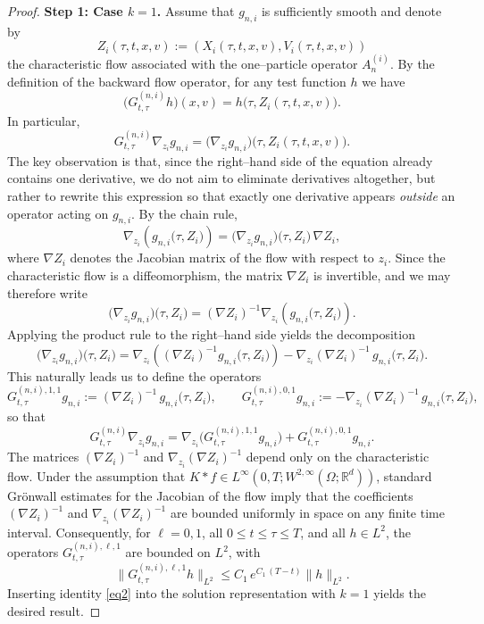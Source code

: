 \documentclass[pdflatex,sn-mathphys-num]{sn-jnl}
\theoremstyle{thmstyleone}%
\theoremstyle{thmstyletwo}%
\theoremstyle{thmstylethree}%
\begin{document}
\begin{proof}
\medskip
\noindent\textbf{Step 1: Case $k=1$.}
Assume that $g_{n,i}$ is sufficiently smooth and denote by
\[
Z_i(\tau,t,x,v) := (X_i(\tau,t,x,v), V_i(\tau,t,x,v))
\]
the characteristic flow associated with the one--particle operator $A_n^{(i)}$.
By the definition of the backward flow operator, for any test function $h$ we have
\[
\big(G^{(n,i)}_{t,\tau} h\big)(x,v) = h\big(\tau, Z_i(\tau,t,x,v)\big).
\]
In particular,
\[
G^{(n,i)}_{t,\tau}\nabla_{z_i} g_{n,i}
=
\big(\nabla_{z_i} g_{n,i}\big)\big(\tau,Z_i(\tau,t,x,v)\big).
\]
The key observation is that, since the right--hand side of the equation already
contains one derivative, we do not aim to eliminate derivatives altogether, but
rather to rewrite this expression so that exactly one derivative appears
\emph{outside} an operator acting on $g_{n,i}$. By the chain rule,
\[
\nabla_{z_i}\!\left(g_{n,i}\big(\tau,Z_i\big)\right)
=
\big(\nabla_{z_i} g_{n,i}\big)\big(\tau,Z_i\big)\,\nabla Z_i,
\]
where $\nabla Z_i$ denotes the Jacobian matrix of the flow with respect to $z_i$.
Since the characteristic flow is a diffeomorphism, the matrix $\nabla Z_i$ is
invertible, and we may therefore write
\[
\big(\nabla_{z_i} g_{n,i}\big)\big(\tau,Z_i\big)
=
(\nabla Z_i)^{-1}
\nabla_{z_i}\!\left(g_{n,i}\big(\tau,Z_i\big)\right).
\]
Applying the product rule to the right--hand side yields the decomposition
\[
\big(\nabla_{z_i} g_{n,i}\big)\big(\tau,Z_i\big)
=
\nabla_{z_i}\!\left((\nabla Z_i)^{-1} g_{n,i}\big(\tau,Z_i\big)\right)
-
\nabla_{z_i}(\nabla Z_i)^{-1}\,
g_{n,i}\big(\tau,Z_i\big).
\]
This naturally leads us to define the operators
\[
G^{(n,i),1,1}_{t,\tau} g_{n,i}
:=
(\nabla Z_i)^{-1}\, g_{n,i}\big(\tau,Z_i\big),
\qquad
G^{(n,i),0,1}_{t,\tau} g_{n,i}
:=
-\nabla_{z_i}(\nabla Z_i)^{-1}\, g_{n,i}\big(\tau,Z_i\big),
\]
so that
\begin{equation}\label{eq2}
G^{(n,i)}_{t,\tau}\nabla_{z_i} g_{n,i}
=
\nabla_{z_i}\big(G^{(n,i),1,1}_{t,\tau} g_{n,i}\big)
+
G^{(n,i),0,1}_{t,\tau} g_{n,i}.
\end{equation}
The matrices $(\nabla Z_i)^{-1}$ and $\nabla_{z_i}(\nabla Z_i)^{-1}$ depend only on
the characteristic flow. Under the assumption that $K*f \in L^{\infty}(0,T;W^{2,\infty}(\Omega;\mathbb{R}^d))$, standard Gr\"onwall estimates for the
Jacobian of the flow imply that the coefficients $(\nabla Z_i)^{-1}$ and
$\nabla_{z_i}(\nabla Z_i)^{-1}$ are bounded uniformly in space on any finite time
interval. Consequently, for $\ell=0,1$, all $0\le t\le \tau\le T$, and all $h \in L^2$, the operators
$G^{(n,i),\ell,1}_{t,\tau}$ are bounded on $L^2$, with
\[
\|G^{(n,i),\ell,1}_{t,\tau} h\|_{L^2}
\le C_1\,e^{C_1\,(T-t)}\|h \|_{L^2}.
\]
Inserting identity \eqref{eq2} into the solution representation with $k=1$
yields the desired result.


\end{proof}
\end{document}
